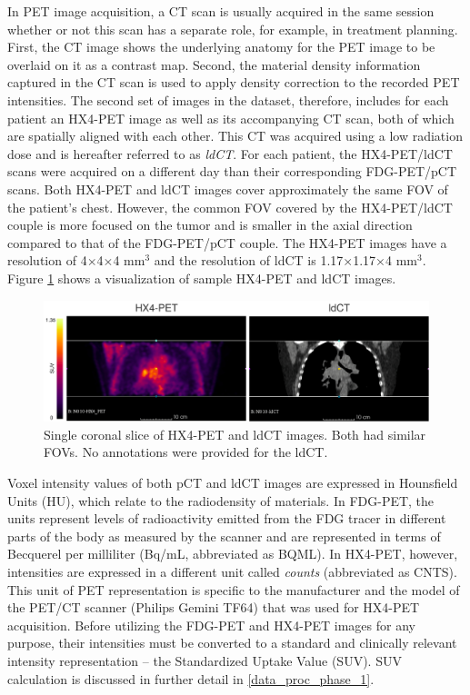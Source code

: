 In PET image acquisition, a CT scan is usually acquired in the same session whether or not this scan has a separate role, for example, in treatment planning. First, the CT image shows the underlying anatomy for the PET image to be overlaid on it as a contrast map. Second, the material density information captured in the CT scan is used to apply density correction to the recorded PET intensities. The second set of images in the dataset, therefore, includes for each patient an HX4-PET image as well as its accompanying CT scan, both of which are spatially aligned with each other. This CT was acquired using a low radiation dose and is hereafter referred to as \textit{ldCT}. For each patient, the HX4-PET/ldCT scans were acquired on a different day than their corresponding FDG-PET/pCT scans. Both HX4-PET and ldCT images cover approximately the same FOV of the patient's chest. However, the common FOV covered by the HX4-PET/ldCT couple is more focused on the tumor and is smaller in the axial direction compared to that of the FDG-PET/pCT couple. The HX4-PET images have a resolution of 4$\times$4$\times$4 mm$^3$ and the resolution of ldCT is 1.17$\times$1.17$\times$4 mm$^3$. Figure \ref{fig:original_hx4pet_ldct} shows a visualization of sample HX4-PET and ldCT images.

\begin{figure}[h!]
    \centering
    \includegraphics[width=\linewidth]{figures/Data/original/N010-HX4_PET_ldCT.png}
    \caption{Single coronal slice of HX4-PET and ldCT images. Both had similar FOVs. No annotations were provided for the ldCT.}
    \label{fig:original_hx4pet_ldct}
\end{figure}

Voxel intensity values of both pCT and ldCT images are expressed in Hounsfield Units (HU), which relate to the radiodensity of materials. In FDG-PET, the units represent levels of radioactivity emitted from the FDG tracer in different parts of the body as measured by the scanner and are represented in terms of Becquerel per milliliter (Bq/mL, abbreviated as BQML). In HX4-PET, however, intensities are expressed in a different unit called \textit{counts} (abbreviated as CNTS). This unit of PET representation is specific to the manufacturer and the model of the PET/CT scanner (Philips Gemini TF64) that was used for HX4-PET acquisition. Before utilizing the FDG-PET and HX4-PET images for any purpose, their intensities must be converted to a standard and clinically relevant intensity representation -- the Standardized Uptake Value (SUV). SUV calculation is discussed in further detail in \ref{data_proc_phase_1}.


